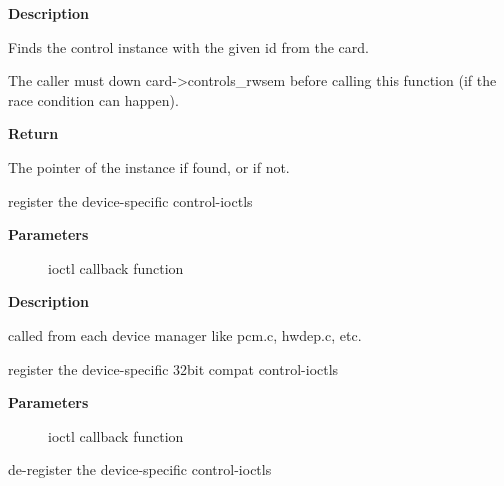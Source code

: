 \documentclass[a4paper,8pt,english]{sphinxmanual}
\begin{document}
\textbf{Description}

Finds the control instance with the given id from the card.

The caller must down card-\textgreater{}controls\_rwsem before calling this function
(if the race condition can happen).

\textbf{Return}

The pointer of the instance if found, or  if not.

\begin{fulllineitems}
\label{sound/kernel-api/alsa-driver-api:c.snd_ctl_register_ioctl}
register the device-specific control-ioctls

\end{fulllineitems}


\textbf{Parameters}
\begin{description}
\item[{}] \leavevmode
ioctl callback function

\end{description}

\textbf{Description}

called from each device manager like pcm.c, hwdep.c, etc.

\begin{fulllineitems}
\label{sound/kernel-api/alsa-driver-api:c.snd_ctl_register_ioctl_compat}
register the device-specific 32bit compat control-ioctls

\end{fulllineitems}


\textbf{Parameters}
\begin{description}
\item[{}] \leavevmode
ioctl callback function

\end{description}

\begin{fulllineitems}
\label{sound/kernel-api/alsa-driver-api:c.snd_ctl_unregister_ioctl}
de-register the device-specific control-ioctls

\end{fulllineitems}
\end{document}

